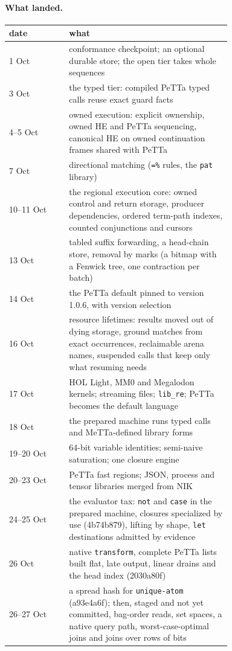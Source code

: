 \documentclass[11pt]{article}
\newcommand{\code}[1]{\texttt{#1}}
\newcommand{\PeTTa}{\textup{PeTTa}}
\newcommand{\HE}{\textup{HE}}
\begin{document}
\paragraph{What landed.}
\begin{center}
\small
\begin{tabular}{@{}lp{0.73\linewidth}@{}}
\toprule
date & what \\
\midrule
1 Oct & conformance checkpoint; an optional durable store; the open tier takes whole sequences \\
3 Oct & the typed tier: compiled \PeTTa{} typed calls reuse exact guard facts \\
4--5 Oct & owned execution: explicit ownership, owned \HE{} and \PeTTa{} sequencing, canonical \HE{} on owned continuation frames shared with \PeTTa{} \\
7 Oct & directional matching (\code{=\%} rules, the \code{pat} library) \\
10--11 Oct & the regional execution core: owned control and return storage, producer dependencies, ordered term-path indexes, counted conjunctions and cursors \\
13 Oct & tabled suffix forwarding, a head-chain store, removal by marks (a bitmap with a Fenwick tree, one contraction per batch) \\
14 Oct & the \PeTTa{} default pinned to version 1.0.6, with version selection \\
16 Oct & resource lifetimes: results moved out of dying storage, ground matches from exact occurrences, reclaimable arena names, suspended calls that keep only what resuming needs \\
17 Oct & HOL Light, MM0 and Megalodon kernels; streaming files; \code{lib\_re}; \PeTTa{} becomes the default language \\
18 Oct & the prepared machine runs typed calls and MeTTa-defined library forms \\
19--20 Oct & 64-bit variable identities; semi-naive saturation; one closure engine \\
20--23 Oct & \PeTTa{} fast regions; JSON, process and tensor libraries merged from NIK \\
24--25 Oct & the evaluator tax: \code{not} and \code{case} in the prepared machine, closures specialized by use (4b74b879), lifting by shape, \code{let} destinations admitted by evidence \\
26 Oct & native \code{transform}, complete \PeTTa{} lists built flat, late output, linear drains and the head index (2030a80f) \\
26--27 Oct & a spread hash for \code{unique-atom} (a93e4a6f); then, staged and not yet committed, bag-order reads, set spaces, a native query path, worst-case-optimal joins and joins over rows of bits \\
\bottomrule
\end{tabular}
\end{center}
\end{document}
